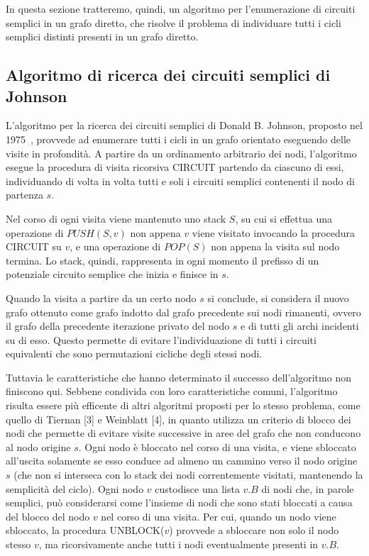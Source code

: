 In questa sezione tratteremo, quindi, un algoritmo per l'enumerazione di circuiti semplici in un grafo diretto, che
risolve il problema di individuare tutti i cicli semplici distinti presenti in un grafo diretto.


\subsection{Algoritmo di ricerca dei circuiti semplici di Johnson} \label{subsec:algoritmo-di-jhonson}
L'algoritmo per la ricerca dei circuiti semplici di Donald B. Johnson, proposto nel 1975~\cite{doi:10.1137/0204007},
provvede ad enumerare tutti i cicli in un grafo orientato eseguendo delle visite in profondit\`a.
A partire da un ordinamento arbitrario dei nodi, l'algoritmo esegue la procedura di visita ricorsiva CIRCUIT partendo
da ciascuno di essi, individuando di volta in volta tutti e soli i circuiti semplici contenenti il nodo di partenza $s$. \newline

Nel corso di ogni visita viene mantenuto uno stack $S$, su cui si effettua una operazione di $PUSH(S, v)$ non
appena $v$ viene visitato invocando la procedura CIRCUIT su $v$, e una operazione di $POP(S)$ non appena la visita
sul nodo termina.
Lo stack, quindi, rappresenta in ogni momento il prefisso di un potenziale circuito semplice che inizia e finisce in $s$.
\newline

Quando la visita a partire da un certo nodo $s$ si conclude, si considera il nuovo grafo ottenuto come grafo indotto
dal grafo precedente sui nodi rimanenti, ovvero il grafo della precedente iterazione privato del nodo $s$ e di tutti
gli archi incidenti su di esso.
Questo permette di evitare l'individuazione di tutti i circuiti equivalenti che sono permutazioni cicliche degli stessi
nodi. \newline

Tuttavia le caratteristiche che hanno determinato il successo dell'algoritmo non finiscono qui.
Sebbene condivida con loro caratteristiche comuni, l'algoritmo risulta essere pi\`u efficente di altri algoritmi
proposti per lo stesso problema, come quello di Tiernan [3] e Weinblatt [4], in quanto utilizza un criterio di blocco
dei nodi che permette di evitare visite successive in aree del grafo che non conducono al nodo origine $s$.
Ogni nodo \`e bloccato nel corso di una visita, e viene sbloccato all'uscita solamente se esso conduce ad almeno
un cammino verso il nodo origine $s$ (che non si interseca con lo stack dei nodi correntemente visitati, mantenendo
la semplicit\`a del ciclo).
Ogni nodo $v$ custodisce una lista $v.B$ di nodi che, in parole semplici, pu\`o considerarsi come l'insieme di nodi
che sono stati bloccati a causa del blocco del nodo $v$ nel corso di una visita.
Per cui, quando un nodo viene sbloccato, la procedura UNBLOCK($v$) provvede a sbloccare non solo il nodo stesso $v$,
ma ricorsivamente anche tutti i nodi eventualmente presenti in $v.B$.

